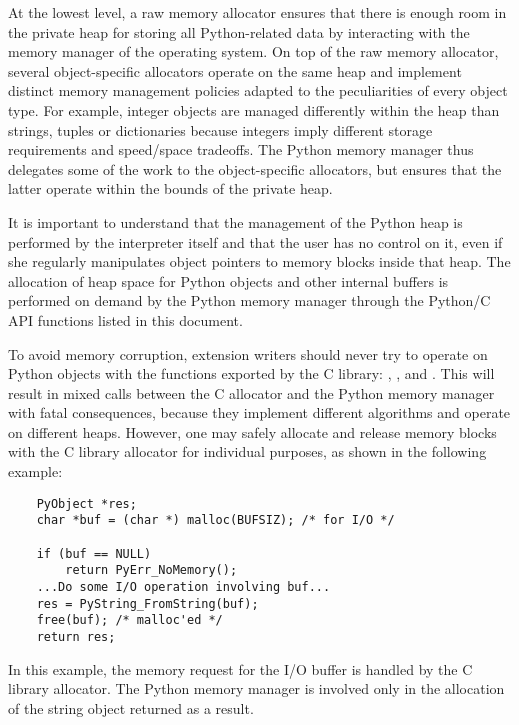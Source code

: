 \documentclass{manual}
\begin{document}
At the lowest level, a raw memory allocator ensures that there is
enough room in the private heap for storing all Python-related data
by interacting with the memory manager of the operating system. On top
of the raw memory allocator, several object-specific allocators
operate on the same heap and implement distinct memory management
policies adapted to the peculiarities of every object type. For
example, integer objects are managed differently within the heap than
strings, tuples or dictionaries because integers imply different
storage requirements and speed/space tradeoffs. The Python memory
manager thus delegates some of the work to the object-specific
allocators, but ensures that the latter operate within the bounds of
the private heap.

It is important to understand that the management of the Python heap
is performed by the interpreter itself and that the user has no
control on it, even if she regularly manipulates object pointers to
memory blocks inside that heap.  The allocation of heap space for
Python objects and other internal buffers is performed on demand by
the Python memory manager through the Python/C API functions listed in
this document.

To avoid memory corruption, extension writers should never try to
operate on Python objects with the functions exported by the C
library: ,
,
 and
.  This will result in 
mixed calls between the C allocator and the Python memory manager
with fatal consequences, because they implement different algorithms
and operate on different heaps.  However, one may safely allocate and
release memory blocks with the C library allocator for individual
purposes, as shown in the following example:

\begin{verbatim}
    PyObject *res;
    char *buf = (char *) malloc(BUFSIZ); /* for I/O */

    if (buf == NULL)
        return PyErr_NoMemory();
    ...Do some I/O operation involving buf...
    res = PyString_FromString(buf);
    free(buf); /* malloc'ed */
    return res;
\end{verbatim}

In this example, the memory request for the I/O buffer is handled by
the C library allocator. The Python memory manager is involved only
in the allocation of the string object returned as a result.
\end{document}
